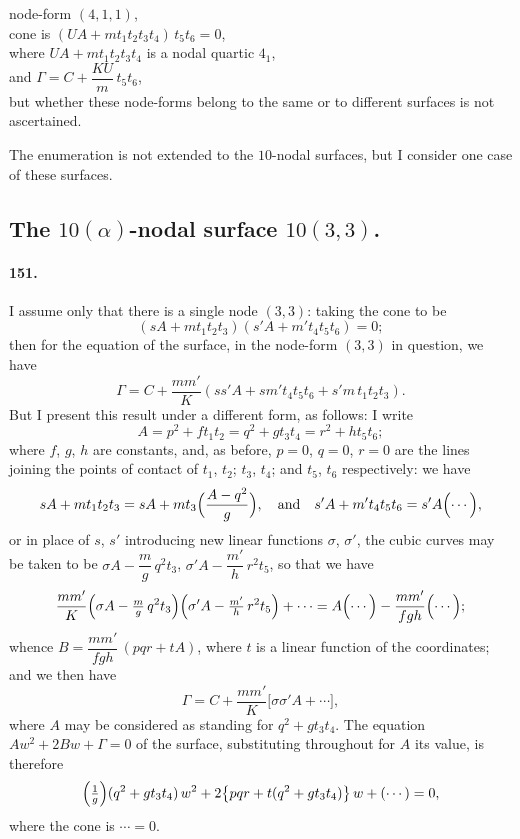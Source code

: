 \documentclass[11pt,a4paper]{article}
\begin{document}
\medskip
\noindent node-form $(4, 1, 1)$,\\
cone is $(UA + m t_1 t_2 t_3 t_4)\, t_5 t_6 = 0$,\\
where $UA + m t_1 t_2 t_3 t_4$ is a nodal quartic $4_1$,\\
and $\Gamma = C + \dfrac{K U}{m}\, t_5 t_6$,\\
but whether these node-forms belong to the same or to different surfaces
is not ascertained.

\medskip
The enumeration is not extended to the $10$-nodal surfaces, but I consider
one case of these surfaces.

\subsection*{The $10(\alpha)$-nodal surface $10(3, 3)$.}

\paragraph{151.}
I assume only that there is a single node $(3, 3)$: taking the cone to be
\[
(sA + m t_1 t_2 t_3)(s'A + m' t_4 t_5 t_6) = 0;
\]
then for the equation of the surface, in the node-form $(3, 3)$ in
question, we have
\[
\Gamma = C + \frac{m m'}{K}(s s' A + s m' t_4 t_5 t_6
+ s' m\, t_1 t_2 t_3).
\]
But I present this result under a different form, as follows: I write
\[
A = p^2 + f t_1 t_2 = q^2 + g t_3 t_4 = r^2 + h t_5 t_6;
\]
where $f$, $g$, $h$ are constants, and, as before, $p = 0$, $q = 0$,
$r = 0$ are the lines joining the points of contact of $t_1$, $t_2$;
$t_3$, $t_4$; and $t_5$, $t_6$ respectively: we have
\[
sA + m t_1 t_2 t_3 = sA + m t_3\Bigl(\frac{A - q^2}{g}\Bigr),\quad
\text{and}\quad s'A + m' t_4 t_5 t_6 = s'A\Bigl(\dotsb\Bigr),
\]
or in place of $s$, $s'$ introducing new linear functions $\sigma$,
$\sigma'$, the cubic curves may be taken to be
$\sigma A - \dfrac{m}{g}\, q^2 t_3$, $\sigma'A - \dfrac{m'}{h}\, r^2 t_5$,
so that we have
\[
\frac{m m'}{K}\Bigl(\sigma A - \tfrac{m}{g}\, q^2 t_3\Bigr)
\Bigl(\sigma' A - \tfrac{m'}{h}\, r^2 t_5\Bigr)
+ \dotsb = A\Bigl(\dotsb\Bigr) - \frac{m m'}{f g h}\Bigl(\dotsb\Bigr);
\]
whence $B = \dfrac{m m'}{f g h}\,(pqr + tA)$, where $t$ is a linear
function of the coordinates; and we then have
\[
\Gamma = C + \frac{m m'}{K}\!\bigl[\sigma\sigma' A + \dotsb\bigr],
\]
where $A$ may be considered as standing for $q^2 + g t_3 t_4$. The
equation $Aw^2 + 2Bw + \Gamma = 0$ of the surface, substituting throughout
for $A$ its value, is therefore
\[
\Bigl(\tfrac{1}{g}\Bigr)(q^2 + g t_3 t_4)\, w^2
+ 2\bigl\{p q r + t (q^2 + g t_3 t_4)\bigr\}\, w + (\dotsb) = 0,
\]
where the cone is $\dotsb = 0$.
\end{document}
